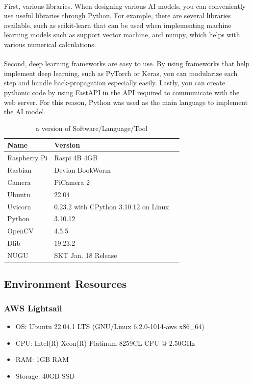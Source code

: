 \\
First, various libraries. When designing various AI models, you can conveniently use useful libraries through Python. For example, there are several libraries available, such as scikit-learn that can be used when implementing machine learning models such as support vector machine, and numpy, which helps with various numerical calculations. \\

\\
Second, deep learning frameworks are easy to use. By using frameworks that help implement deep learning, such as PyTorch or Keras, you can modularize each step and handle back-propagation especially easily. Lastly, you can create pythonic code by using FastAPI in the API required to communicate with the web server. For this reason, Python was used as the main language to implement the AI model.\\




\begin{table}[h]
    \caption{a version of Software/Language/Tool}
    \begin{tabular}{|p{2.6cm}|p{1.7cm}|p{3.4cm}|}
    \hline
    Name & Version \\ \hline
      Raspberry Pi & Raspi 4B 4GB \\ \hline
      Rasbian & Devian BookWorm \\ \hline
      Camera & PiCamera 2\\ \hline
      Ubuntu & 22.04\\ \hline
      Uvicorn & 0.23.2 with CPython 3.10.12 on Linux\\ \hline
      Python & 3.10.12 \\ \hline
      OpenCV & 4.5.5 \\ \hline
      Dlib & 19.23.2 \\ \hline
      NUGU & SKT Jan. 18 Release \\ \hline
      
    \end{tabular}
    \end{table}


\subsection{\textbf{Environment Resources}}
\subsubsection{\textbf{AWS Lightsail}}
\begin{itemize}
    \item OS: Ubuntu 22.04.1 LTS (GNU/Linux 6.2.0-1014-aws x86\_64)
    \item CPU: Intel(R) Xeon(R) Platinum 8259CL CPU @ 2.50GHz
    \item RAM: 1GB RAM
    \item Storage: 40GB SSD
\end{itemize}
